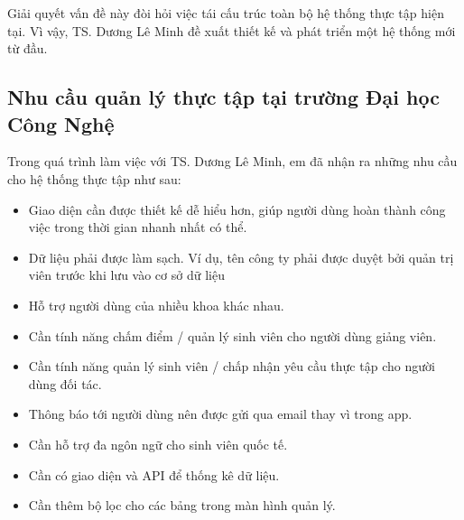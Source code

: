 \documentclass[./../main.tex]{subfiles}
\begin{document}
Giải quyết vấn đề này đòi hỏi việc tái cấu trúc toàn bộ hệ thống thực
tập hiện tại. Vì vậy, TS. Dương Lê Minh đề xuất thiết kế và phát triển
một hệ thống mới từ đầu.

\subsection{Nhu cầu quản lý thực tập tại trường Đại học Công Nghệ}

Trong quá trình làm việc với TS. Dương Lê Minh, em đã nhận ra những nhu
cầu cho hệ thống thực tập như sau:

\begin{itemize}
\item
  
  Giao diện cần được thiết kế dễ hiểu hơn, giúp người dùng hoàn thành
  công việc trong thời gian nhanh nhất có thể.
  
\item
  
  Dữ liệu phải được làm sạch. Ví dụ, tên công ty phải được duyệt bởi
  quản trị viên trước khi lưu vào cơ sở dữ liệu
  
\item
  
  Hỗ trợ người dùng của nhiều khoa khác nhau.
  
\item
  
  Cần tính năng chấm điểm / quản lý sinh viên cho người dùng giảng viên.
  
\item
  
  Cần tính năng quản lý sinh viên / chấp nhận yêu cầu thực tập cho người
  dùng đối tác.
  
\item
  
  Thông báo tới người dùng nên được gửi qua email thay vì trong app.
  
\item
  
  Cần hỗ trợ đa ngôn ngữ cho sinh viên quốc tế.
  
\item
  
  Cần có giao diện và API để thống kê dữ liệu.
  
\item
  
  Cần thêm bộ lọc cho các bảng trong màn hình quản lý.
  
\end{itemize}
\end{document}

